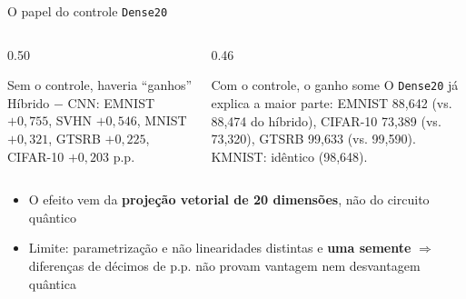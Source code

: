 \documentclass[aspectratio=169,11pt,brazil]{beamer}
\begin{document}
\begin{frame}{O papel do controle \texttt{Dense20}}
  \begin{columns}[T]
    \begin{column}{0.50\textwidth}
      \begin{alertblock}{Sem o controle, haveria ``ganhos''}
        Híbrido $-$ CNN: EMNIST $+0{,}755$, SVHN $+0{,}546$, MNIST $+0{,}321$, GTSRB $+0{,}225$, CIFAR-10 $+0{,}203$ p.p.
      \end{alertblock}
    \end{column}
    \begin{column}{0.46\textwidth}
      \begin{block}{Com o controle, o ganho some}
        O \texttt{Dense20} já explica a maior parte: EMNIST 88,642 (vs. 88,474 do híbrido), CIFAR-10 73,389 (vs. 73,320), GTSRB 99,633 (vs. 99,590). KMNIST: idêntico (98,648).
      \end{block}
    \end{column}
  \end{columns}
  \vspace{0.2cm}
  \begin{itemize}
    \item O efeito vem da \textbf{projeção vetorial de 20 dimensões}, não do circuito quântico
    \item Limite: parametrização e não linearidades distintas e \textbf{uma semente} $\Rightarrow$ diferenças de décimos de p.p. não provam vantagem nem desvantagem quântica
  \end{itemize}
\end{frame}
\end{document}
